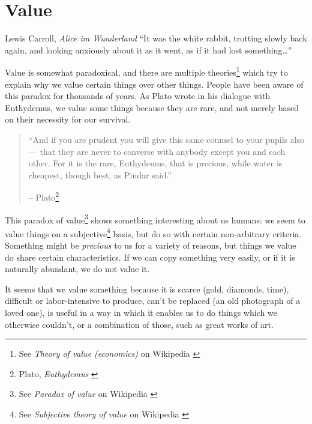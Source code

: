 \chapter{Value}
\label{les:10}

\begin{chapquote}{Lewis Carroll, \textit{Alice im Wunderland}}
\enquote{It was the white rabbit, trotting slowly back again, and looking anxiously
about it as it went, as if it had lost something\ldots}
\end{chapquote}

Value is somewhat paradoxical, and there are multiple theories\footnote{See
\textit{Theory of value (economics)} on Wikipedia \cite{wiki:theory-of-value}}
which try to explain why we value certain things over other things. People have
been aware of this paradox for thousands of years. As Plato wrote in his
dialogue with Euthydemus, we value some things because they are rare, and not
merely based on their necessity for our survival.

\begin{quotation}\begin{samepage}
\enquote{And if you are prudent you will give this same counsel to your pupils
also --- that they are never to converse with anybody except you and
each other. For it is the rare, Euthydemus, that is precious, while
water is cheapest, though best, as Pindar said.}
\begin{flushright} -- Plato\footnote{Plato, \textit{Euthydemus} \cite{euthydemus}}
\end{flushright}\end{samepage}\end{quotation}

This paradox of value\footnote{See \textit{Paradox of value} on Wikipedia
\cite{wiki:paradox-of-value}} shows something interesting about us humans: we
seem to value things on a subjective\footnote{See \textit{Subjective theory of
value} on Wikipedia \cite{wiki:subjective-theory-of-value}} basis, but do so
with certain non-arbitrary criteria. Something might be \textit{precious} to us
for a variety of reasons, but things we value do share certain characteristics.
If we can copy something very easily, or if it is naturally abundant, we do not
value it.

It seems that we value something because it is scarce (gold, diamonds,
time), difficult or labor-intensive to produce, can't be replaced (an
old photograph of a loved one), is useful in a way in which it enables
us to do things which we otherwise couldn't, or a combination of those,
such as great works of art.


